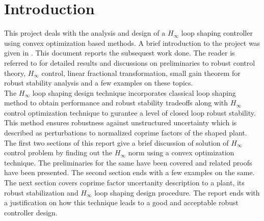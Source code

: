 \documentclass[a4paper,12pt]{article}
\begin{document}
%
\section{Introduction}
This project deals with the analysis and design of a $H_{\infty}$ loop shaping controller using convex optimization based methods.
A brief introduction to the project was given in \cite{prev}. This document reports the subsequest work done. The reader is referred to \cite{prev} for detailed results and discussions on preliminaries to robust control theory, $H_{\infty}$ control, linear fractional transformation, small gain theorem for robust stability analysis and a few examples on these topics. \\
The $H_{\infty}$ loop shaping design technique incorporates classical loop shaping method to obtain performance and robust stability tradeoffs along with $H_{\infty}$ control optimization technique to gurantee a level of closed loop robust stability. This method ensures robustness against unstructured uncertainty which is described as perturbations to normalized coprime factors of the shaped plant. \\
The first two sections of this report give a brief discussion of solution of $H_{\infty}$ control problem by finding out the $H_{\infty}$ norm using a convex optimization technique. The preliminaries for the same have been covered and related proofs have been presented. The second section ends with a few examples on the same. The next section covers coprime factor uncertanity description to a plant, its robust stabilization and $H_{\infty}$ loop shaping design procedure. The report ends with a justification on how this technique leads to a good and acceptable robust controller design.
\end{document}
